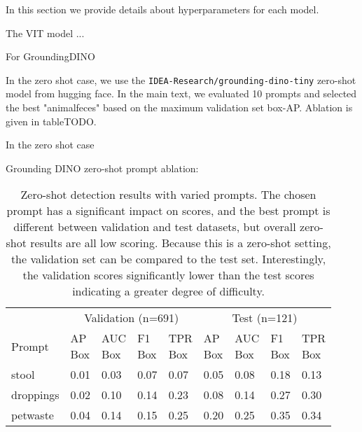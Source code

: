 In this section we provide details about hyperparameters for each model.

The VIT model ...

For GroundingDINO

In the zero shot case, we use the \texttt{IDEA-Research/grounding-dino-tiny} zero-shot model from hugging face.
In the main text, we evaluated 10 prompts and selected the best "animalfeces"
based on the maximum validation set box-AP. Ablation is given in tableTODO.

In the zero shot case 

Grounding DINO zero-shot prompt ablation:

\begin{table}[t]
\caption{Zero-shot detection results with varied prompts. The chosen prompt has a significant impact on scores, and the best prompt is different between validation and test datasets, but overall zero-shot results are all low scoring. Because this is a zero-shot setting, the validation set can be compared to the test set. Interestingly, the validation scores significantly lower than the test scores indicating a greater degree of difficulty. }
\label{tab:prompt_variations}
\centering
\begin{tabular}{lllllllll}
\toprule
\multicolumn{1}{l}{} & \multicolumn{4}{c}{Validation (n=691)} & \multicolumn{4}{c}{Test (n=121)} \\
 Prompt      & \makecell{AP\\Box}   & \makecell{AUC\\Box}   & \makecell{F1\\Box}   & \makecell{TPR\\Box}   & \makecell{AP\\Box}   & \makecell{AUC\\Box}   & \makecell{F1\\Box}   & \makecell{TPR\\Box}   \\
\midrule
 stool       & 0.01                 & 0.03                  & 0.07                 & 0.07                  & 0.05                 & 0.08                  & 0.18                 & 0.13                  \\
 droppings   & 0.02                 & 0.10                  & 0.14                 & 0.23                  & 0.08                 & 0.14                  & 0.27                 & 0.30                  \\
 petwaste    & 0.04                 & 0.14                  & 0.15                 & 0.25                  & 0.20                 & 0.25                  & 0.35                 & 0.34                  \\

\end{tabular}
\end{table}
